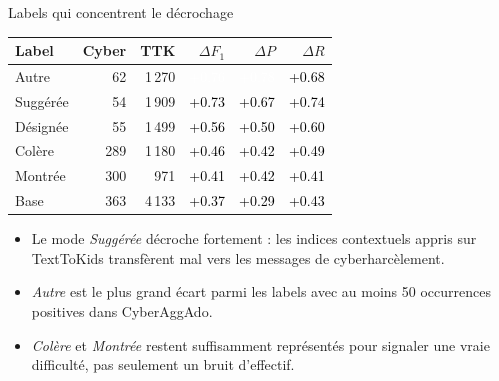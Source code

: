\documentclass[aspectratio=169,xcolor=table]{beamer}
\begin{document}
\begin{frame}{Labels qui concentrent le d\'ecrochage}
  \small
  \begin{tabular}{@{}lrrrrr@{}}
    \toprule
    Label & Cyber & TTK & $\Delta F_1$ & $\Delta P$ & $\Delta R$ \\
    \midrule
    Autre & 62 & 1\,270 & \cellcolor[HTML]{E4602C}\textcolor{white}{+0.76} & \cellcolor[HTML]{E25727}\textcolor{white}{+0.78} & \cellcolor[HTML]{E97B39}\textcolor{black}{+0.68} \\
    Sugg\'er\'ee & 54 & 1\,909 & \cellcolor[HTML]{E5682F}\textcolor{black}{+0.73} & \cellcolor[HTML]{E97C3A}\textcolor{black}{+0.67} & \cellcolor[HTML]{E5642D}\textcolor{black}{+0.74} \\
    D\'esign\'ee & 55 & 1\,499 & \cellcolor[HTML]{EFA24F}\textcolor{black}{+0.56} & \cellcolor[HTML]{F1B55B}\textcolor{black}{+0.50} & \cellcolor[HTML]{ED9447}\textcolor{black}{+0.60} \\
    Col\`ere & 289 & 1\,180 & \cellcolor[HTML]{F0CB66}\textcolor{black}{+0.46} & \cellcolor[HTML]{EEDD6F}\textcolor{black}{+0.42} & \cellcolor[HTML]{F1BA5D}\textcolor{black}{+0.49} \\
    Montr\'ee & 300 & 971 & \cellcolor[HTML]{EEE172}\textcolor{black}{+0.41} & \cellcolor[HTML]{EEDF71}\textcolor{black}{+0.42} & \cellcolor[HTML]{EEE373}\textcolor{black}{+0.41} \\
    Base & 363 & 4\,133 & \cellcolor[HTML]{E4EC7F}\textcolor{black}{+0.37} & \cellcolor[HTML]{CBEA92}\textcolor{black}{+0.29} & \cellcolor[HTML]{EEDC6F}\textcolor{black}{+0.43} \\
    \bottomrule
  \end{tabular}

  \vspace{1.1em}
  \begin{itemize}
    \item Le mode \textit{Sugg\'er\'ee} d\'ecroche fortement : les indices contextuels appris sur TextToKids transf\`erent mal vers les messages de cyberharc\`element.
    \item \textit{Autre} est le plus grand \'ecart parmi les labels avec au moins 50 occurrences positives dans CyberAggAdo.
    \item \textit{Col\`ere} et \textit{Montr\'ee} restent suffisamment repr\'esent\'es pour signaler une vraie difficult\'e, pas seulement un bruit d'effectif.
  \end{itemize}
\end{frame}
\end{document}
